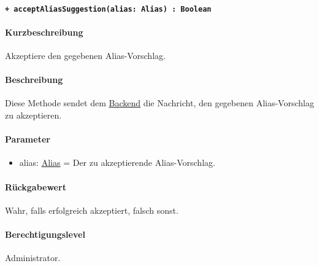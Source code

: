 \paragraph{\texttt{+ acceptAliasSuggestion(alias: Alias) : Boolean}}\label{AP_Framework_acceptAliasSuggestion}%
\paragraph*{Kurzbeschreibung}
Akzeptiere den gegebenen Alias-Vorschlag.
\paragraph*{Beschreibung}
Diese Methode sendet dem \hyperref[AP_Backend]{Backend} die Nachricht, den gegebenen Alias-Vorschlag zu akzeptieren.
\paragraph*{Parameter}
\begin{itemize}
    \item alias: \hyperref[AP_Alias]{Alias} = Der zu akzeptierende Alias-Vorschlag.
\end{itemize}
\paragraph*{Rückgabewert}
Wahr, falls erfolgreich akzeptiert, falsch sonst.
\paragraph*{Berechtigungslevel}
Administrator.